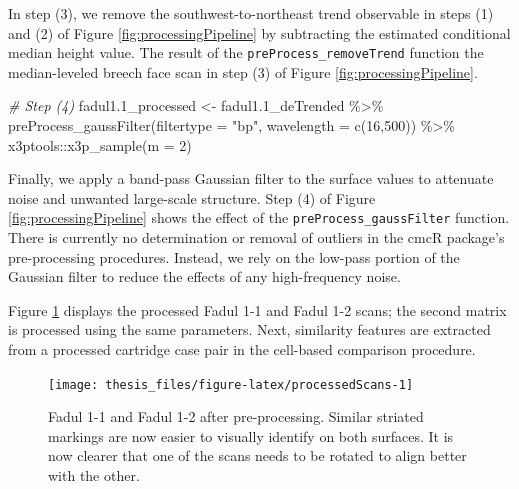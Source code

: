 \documentclass[11pt,]{isuthesis}
\newenvironment{Shaded}{\begin{snugshade}}{\end{snugshade}}
\newcommand{\AttributeTok}[1]{\textcolor[rgb]{0.77,0.63,0.00}{#1}}
\newcommand{\CommentTok}[1]{\textcolor[rgb]{0.56,0.35,0.01}{\textit{#1}}}
\newcommand{\DecValTok}[1]{\textcolor[rgb]{0.00,0.00,0.81}{#1}}
\newcommand{\FloatTok}[1]{\textcolor[rgb]{0.00,0.00,0.81}{#1}}
\newcommand{\FunctionTok}[1]{\textcolor[rgb]{0.00,0.00,0.00}{#1}}
\newcommand{\NormalTok}[1]{#1}
\newcommand{\OtherTok}[1]{\textcolor[rgb]{0.56,0.35,0.01}{#1}}
\newcommand{\SpecialCharTok}[1]{\textcolor[rgb]{0.00,0.00,0.00}{#1}}
\newcommand{\StringTok}[1]{\textcolor[rgb]{0.31,0.60,0.02}{#1}}
\begin{document}
In step (3), we remove the southwest-to-northeast trend observable in steps (1) and (2) of Figure \ref{fig:processingPipeline} by subtracting the estimated conditional median height value.
The result of the \texttt{preProcess\_removeTrend} function the median-leveled breech face scan in step (3) of Figure \ref{fig:processingPipeline}.

\begin{Shaded}
\begin{Highlighting}[]
\CommentTok{\# Step (4)}
\NormalTok{fadul1}\FloatTok{.1}\NormalTok{\_processed }\OtherTok{\textless{}{-}}\NormalTok{ fadul1}\FloatTok{.1}\NormalTok{\_deTrended }\SpecialCharTok{\%\textgreater{}\%}
  \FunctionTok{preProcess\_gaussFilter}\NormalTok{(}\AttributeTok{filtertype =} \StringTok{"bp"}\NormalTok{, }\AttributeTok{wavelength =} \FunctionTok{c}\NormalTok{(}\DecValTok{16}\NormalTok{,}\DecValTok{500}\NormalTok{)) }\SpecialCharTok{\%\textgreater{}\%}
\NormalTok{  x3ptools}\SpecialCharTok{::}\FunctionTok{x3p\_sample}\NormalTok{(}\AttributeTok{m =} \DecValTok{2}\NormalTok{)}
\end{Highlighting}
\end{Shaded}

Finally, we apply a band-pass Gaussian filter to the surface values to attenuate noise and unwanted large-scale structure.
Step (4) of Figure \ref{fig:processingPipeline} shows the effect of the \texttt{preProcess\_gaussFilter} function.
There is currently no determination or removal of outliers in the cmcR package's pre-processing procedures.
Instead, we rely on the low-pass portion of the Gaussian filter to reduce the effects of any high-frequency noise.

Figure \ref{fig:processedScans} displays the processed Fadul 1-1 and Fadul 1-2 scans; the second matrix is processed using the same parameters.
Next, similarity features are extracted from a processed cartridge case pair in the cell-based comparison procedure.

\begin{figure}[htbp]

{\centering \texttt{[image: thesis\_files/figure-latex/processedScans-1]} 

}

\caption{Fadul 1-1 and Fadul 1-2 after pre-processing. Similar striated markings are now easier to visually identify on both surfaces. It is now clearer that one of the scans needs to be rotated to align better with the other.}\label{fig:processedScans}
\end{figure}
\end{document}
